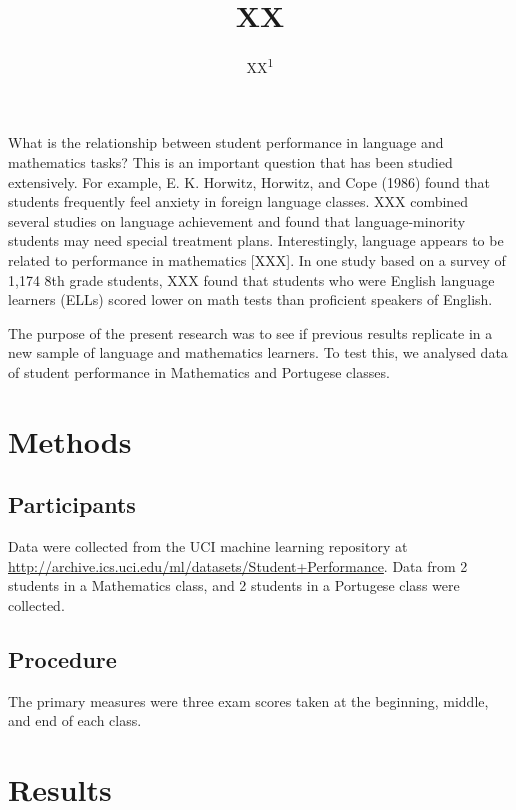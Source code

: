 \documentclass[english,floatsintext,man]{apa6}
\title{XX}
\author{XX\textsuperscript{1}}
\affiliation{
    \vspace{0.5cm}
          \textsuperscript{1} XX  }
\theoremstyle{definition}
\theoremstyle{definition}
\theoremstyle{definition}
\theoremstyle{remark}
\begin{document}
\maketitle

\setcounter{secnumdepth}{0}



What is the relationship between student performance in language and
mathematics tasks? This is an important question that has been studied
extensively. For example, E. K. Horwitz, Horwitz, and Cope (1986) found
that students frequently feel anxiety in foreign language classes. XXX
combined several studies on language achievement and found that
language-minority students may need special treatment plans.
Interestingly, language appears to be related to performance in
mathematics {[}XXX{]}. In one study based on a survey of 1,174 8th grade
students, XXX found that students who were English language learners
(ELLs) scored lower on math tests than proficient speakers of English.

The purpose of the present research was to see if previous results
replicate in a new sample of language and mathematics learners. To test
this, we analysed data of student performance in Mathematics and
Portugese classes.

\section{Methods}\label{methods}

\subsection{Participants}\label{participants}

Data were collected from the UCI machine learning repository at
\url{http://archive.ics.uci.edu/ml/datasets/Student+Performance}. Data
from 2 students in a Mathematics class, and 2 students in a Portugese
class were collected.

\subsection{Procedure}\label{procedure}

The primary measures were three exam scores taken at the beginning,
middle, and end of each class.

\section{Results}\label{results}
\end{document}
